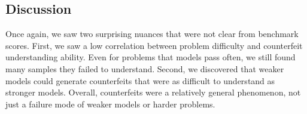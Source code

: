 


\subsection{Discussion}
Once again, we saw two surprising nuances that were not clear from benchmark scores. First, we saw a
low correlation between problem difficulty and counterfeit understanding ability. Even for problems that
models pass often, we still found many samples they failed to understand. Second, we discovered that weaker models could generate counterfeits that were as difficult to understand
as stronger models. Overall, counterfeits were a relatively general phenomenon, not just a failure mode
of weaker models or harder problems.
